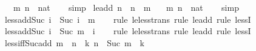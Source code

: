\begin{isabellebody}
\ \ \ m\ n\ {\isacharcolon}{\kern0pt}{\isacharcolon}{\kern0pt}\ nat\isanewline
%
\isadelimproof
\ \ %
\endisadelimproof
%
\isatagproof
{}\isamarkupfalse%
\ simp%
\endisatagproof
{\isafoldproof}%
%
\isadelimproof
\isanewline
%
\endisadelimproof
\isanewline
{}\isamarkupfalse%
\ le{\isacharunderscore}{\kern0pt}add{}{\isacharcolon}{\kern0pt}\ {\isachardoublequoteopen}n\ {\isasymle}\ n\ {\isacharplus}{\kern0pt}\ m{\isachardoublequoteclose}\isanewline
\ \ \ m\ n\ {\isacharcolon}{\kern0pt}{\isacharcolon}{\kern0pt}\ nat\isanewline
%
\isadelimproof
\ \ %
\endisadelimproof
%
\isatagproof
{}\isamarkupfalse%
\ simp%
\endisatagproof
{\isafoldproof}%
%
\isadelimproof
\isanewline
%
\endisadelimproof
\isanewline
{}\isamarkupfalse%
\ less{\isacharunderscore}{\kern0pt}add{\isacharunderscore}{\kern0pt}Suc{}{\isacharcolon}{\kern0pt}\ {\isachardoublequoteopen}i\ {\isacharless}{\kern0pt}\ Suc\ {\isacharparenleft}{\kern0pt}i\ {\isacharplus}{\kern0pt}\ m{\isacharparenright}{\kern0pt}{\isachardoublequoteclose}\isanewline
%
\isadelimproof
\ \ %
\endisadelimproof
%
\isatagproof
{}\isamarkupfalse%
\ {\isacharparenleft}{\kern0pt}rule\ le{\isacharunderscore}{\kern0pt}less{\isacharunderscore}{\kern0pt}trans{\isacharcomma}{\kern0pt}\ rule\ le{\isacharunderscore}{\kern0pt}add{}{\isacharcomma}{\kern0pt}\ rule\ lessI{\isacharparenright}{\kern0pt}%
\endisatagproof
{\isafoldproof}%
%
\isadelimproof
\isanewline
%
\endisadelimproof
\isanewline
{}\isamarkupfalse%
\ less{\isacharunderscore}{\kern0pt}add{\isacharunderscore}{\kern0pt}Suc{}{\isacharcolon}{\kern0pt}\ {\isachardoublequoteopen}i\ {\isacharless}{\kern0pt}\ Suc\ {\isacharparenleft}{\kern0pt}m\ {\isacharplus}{\kern0pt}\ i{\isacharparenright}{\kern0pt}{\isachardoublequoteclose}\isanewline
%
\isadelimproof
\ \ %
\endisadelimproof
%
\isatagproof
{}\isamarkupfalse%
\ {\isacharparenleft}{\kern0pt}rule\ le{\isacharunderscore}{\kern0pt}less{\isacharunderscore}{\kern0pt}trans{\isacharcomma}{\kern0pt}\ rule\ le{\isacharunderscore}{\kern0pt}add{}{\isacharcomma}{\kern0pt}\ rule\ lessI{\isacharparenright}{\kern0pt}%
\endisatagproof
{\isafoldproof}%
%
\isadelimproof
\isanewline
%
\endisadelimproof
\isanewline
{}\isamarkupfalse%
\ less{\isacharunderscore}{\kern0pt}iff{\isacharunderscore}{\kern0pt}Suc{\isacharunderscore}{\kern0pt}add{\isacharcolon}{\kern0pt}\ {\isachardoublequoteopen}m\ {\isacharless}{\kern0pt}\ n\ {\isasymlongleftrightarrow}\ {\isacharparenleft}{\kern0pt}{\isasymexists}k{\isachardot}{\kern0pt}\ n\ {\isacharequal}{\kern0pt}\ Suc\ {\isacharparenleft}{\kern0pt}m\ {\isacharplus}{\kern0pt}\ k{\isacharparenright}{\kern0pt}{\isacharparenright}{\kern0pt}{\isachardoublequoteclose}\isanewline

\end{isabellebody}
